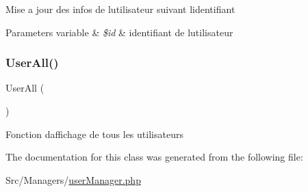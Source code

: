 Mise a jour des infos de l\textquotesingle{}utilisateur suivant l\textquotesingle{}identifiant 
\begin{DoxyParams}[1]{Parameters}
variable & {\em \$id} & identifiant de l\textquotesingle{}utilisateur \\
\hline
\end{DoxyParams}
\mbox{\label{class_src_1_1_managers_1_1user_manager_a0a377befd1052a5f989fd915af31373b}} 
\subsubsection{\texorpdfstring{User\+All()}{UserAll()}}
{\footnotesize\ttfamily User\+All (\begin{DoxyParamCaption}{ }\end{DoxyParamCaption})}

Fonction d\textquotesingle{}affichage de tous les utilisateurs 

The documentation for this class was generated from the following file\+:\begin{DoxyCompactItemize}
\item 
Src/\+Managers/\hyperlink{user_manager_8php}{user\+Manager.\+php}\end{DoxyCompactItemize}

